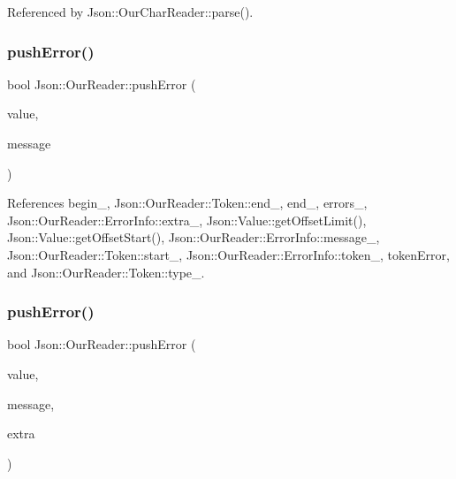 Referenced by Json\+::\+Our\+Char\+Reader\+::parse().

\mbox{\label{classJson_1_1OurReader_a700e9d8e0977fa7e0375d26690d7025f_a700e9d8e0977fa7e0375d26690d7025f}} 
\subsubsection{\texorpdfstring{push\+Error()}{pushError()}\hspace{0.1cm}{\footnotesize\ttfamily [1/2]}}
{\footnotesize\ttfamily bool Json\+::\+Our\+Reader\+::push\+Error (\begin{DoxyParamCaption}\item[{const \hyperlink{classJson_1_1Value}{Value} \&}]{value,  }\item[{const \hyperlink{json_8h_a1e723f95759de062585bc4a8fd3fa4be_a1e723f95759de062585bc4a8fd3fa4be}{J\+S\+O\+N\+C\+P\+P\+\_\+\+S\+T\+R\+I\+NG} \&}]{message }\end{DoxyParamCaption})}



References begin\+\_\+, Json\+::\+Our\+Reader\+::\+Token\+::end\+\_\+, end\+\_\+, errors\+\_\+, Json\+::\+Our\+Reader\+::\+Error\+Info\+::extra\+\_\+, Json\+::\+Value\+::get\+Offset\+Limit(), Json\+::\+Value\+::get\+Offset\+Start(), Json\+::\+Our\+Reader\+::\+Error\+Info\+::message\+\_\+, Json\+::\+Our\+Reader\+::\+Token\+::start\+\_\+, Json\+::\+Our\+Reader\+::\+Error\+Info\+::token\+\_\+, token\+Error, and Json\+::\+Our\+Reader\+::\+Token\+::type\+\_\+.

\mbox{\label{classJson_1_1OurReader_addccecfca74b79adaad6115ddd614477_addccecfca74b79adaad6115ddd614477}} 
\subsubsection{\texorpdfstring{push\+Error()}{pushError()}\hspace{0.1cm}{\footnotesize\ttfamily [2/2]}}
{\footnotesize\ttfamily bool Json\+::\+Our\+Reader\+::push\+Error (\begin{DoxyParamCaption}\item[{const \hyperlink{classJson_1_1Value}{Value} \&}]{value,  }\item[{const \hyperlink{json_8h_a1e723f95759de062585bc4a8fd3fa4be_a1e723f95759de062585bc4a8fd3fa4be}{J\+S\+O\+N\+C\+P\+P\+\_\+\+S\+T\+R\+I\+NG} \&}]{message,  }\item[{const \hyperlink{classJson_1_1Value}{Value} \&}]{extra }\end{DoxyParamCaption})}



